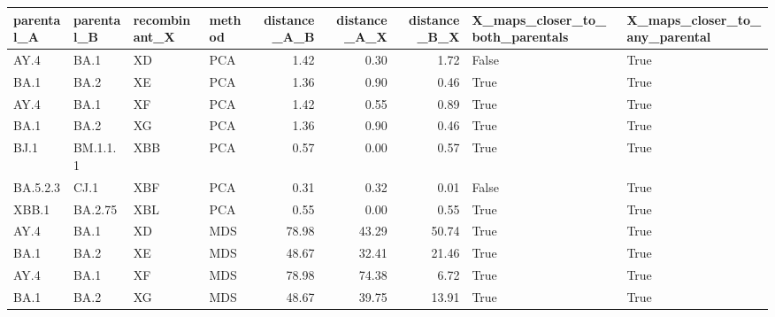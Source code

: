 \begin{tabular}{llllrrrll}
\toprule
parental\_A & parental\_B & recombinant\_X & method &  distance\_A\_B &  distance\_A\_X &  distance\_B\_X &  X\_maps\_closer\_to\_both\_parentals &  X\_maps\_closer\_to\_any\_parental \\
\midrule
      AY.4 &       BA.1 &            XD &    PCA &          1.42 &          0.30 &          1.72 &                            False &                           True \\
      BA.1 &       BA.2 &            XE &    PCA &          1.36 &          0.90 &          0.46 &                             True &                           True \\
      AY.4 &       BA.1 &            XF &    PCA &          1.42 &          0.55 &          0.89 &                             True &                           True \\
      BA.1 &       BA.2 &            XG &    PCA &          1.36 &          0.90 &          0.46 &                             True &                           True \\
      BJ.1 &   BM.1.1.1 &           XBB &    PCA &          0.57 &          0.00 &          0.57 &                             True &                           True \\
  BA.5.2.3 &       CJ.1 &           XBF &    PCA &          0.31 &          0.32 &          0.01 &                            False &                           True \\
     XBB.1 &    BA.2.75 &           XBL &    PCA &          0.55 &          0.00 &          0.55 &                             True &                           True \\
      AY.4 &       BA.1 &            XD &    MDS &         78.98 &         43.29 &         50.74 &                             True &                           True \\
      BA.1 &       BA.2 &            XE &    MDS &         48.67 &         32.41 &         21.46 &                             True &                           True \\
      AY.4 &       BA.1 &            XF &    MDS &         78.98 &         74.38 &          6.72 &                             True &                           True \\
      BA.1 &       BA.2 &            XG &    MDS &         48.67 &         39.75 &         13.91 &                             True &                           True \\

\end{tabular}
